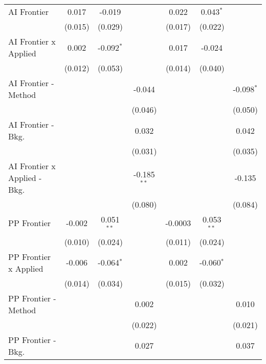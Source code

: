 \begin{tabular}{lcccccc}
   AI Frontier                    & 0.017        & -0.019        &               & 0.022   & 0.043$^{*}$  &   \\   
                                  & (0.015)      & (0.029)       &               & (0.017) & (0.022)      &   \\   
   AI Frontier x Applied          & 0.002        & -0.092$^{*}$  &               & 0.017   & -0.024       &   \\   
                                  & (0.012)      & (0.053)       &               & (0.014) & (0.040)      &   \\   
   AI Frontier - Method           &              &               & -0.044        &         &              & -0.098$^{*}$\\   
                                  &              &               & (0.046)       &         &              & (0.050)\\   
   AI Frontier - Bkg.             &              &               & 0.032         &         &              & 0.042\\   
                                  &              &               & (0.031)       &         &              & (0.035)\\   
   AI Frontier x Applied - Bkg.   &              &               & -0.185$^{**}$ &         &              & -0.135\\   
                                  &              &               & (0.080)       &         &              & (0.084)\\   
   PP Frontier                    & -0.002       & 0.051$^{**}$  &               & -0.0003 & 0.053$^{**}$ &   \\   
                                  & (0.010)      & (0.024)       &               & (0.011) & (0.024)      &   \\   
   PP Frontier x Applied          & -0.006       & -0.064$^{*}$  &               & 0.002   & -0.060$^{*}$ &   \\   
                                  & (0.014)      & (0.034)       &               & (0.015) & (0.032)      &   \\   
   PP Frontier - Method           &              &               & 0.002         &         &              & 0.010\\   
                                  &              &               & (0.022)       &         &              & (0.021)\\   
   PP Frontier - Bkg.             &              &               & 0.027         &         &              & 0.037\\   

\end{tabular}
